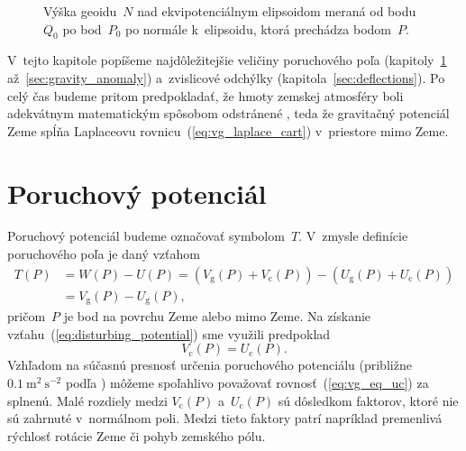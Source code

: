 \documentclass[a4paper, 12pt]{book}
\newcommand{\gidx}{\mathrm g}
\newcommand{\cidx}{\mathrm c}
\begin{document}
\begin{figure}[bt]
\centering

\caption{Výška geoidu~$N$ nad ekvipotenciálnym elipsoidom meraná od bodu~$Q_0$ 
po bod~$P_0$ po normále k~elipsoidu, ktorá prechádza bodom~$P$.}
\label{fig:geoid}
\end{figure}

V~tejto kapitole popíšeme najdôležitejšie veličiny poruchového poľa 
(kapitoly~\ref{sec:disturbing_potential} až~\ref{sec:gravity_anomaly}) 
a~zvislicové odchýlky (kapitola~\ref{sec:deflections}).  Po celý čas budeme 
pritom predpokladať, že hmoty zemskej atmosféry boli adekvátnym matematickým 
spôsobom odstránené \parencite[pozri napríklad][]{Janak2006}, teda že 
gravitačný potenciál Zeme spĺňa Laplaceovu rovnicu~(\ref{eq:vg_laplace_cart}) 
v~priestore mimo Zeme.






\section{Poruchový potenciál}
\label{sec:disturbing_potential}

Poruchový potenciál budeme označovať symbolom~$T$.  V~zmysle definície 
poruchového poľa je daný vzťahom
%
\begin{equation}
\label{eq:disturbing_potential}
\begin{split}
T(P) &= W(P) - U(P) = (V_\gidx(P) + V_\cidx(P)) - (U_\gidx(P) + U_\cidx(P))\\
%
&= V_\gidx(P) - U_\gidx(P){,}
\end{split}
\end{equation}
%
pričom~$P$ je bod na povrchu Zeme alebo mimo Zeme.  Na získanie 
vzťahu~(\ref{eq:disturbing_potential}) sme využili predpoklad
%
\begin{equation}
\label{eq:vg_eq_uc}
V_\cidx(P) = U_\cidx(P){.}
\end{equation}
%
Vzhľadom na súčasnú presnosť určenia poruchového potenciálu (približne $0.1\ 
\mathrm{m}^2 \ \mathrm{s}^{-2}$ podľa \cite{SansoGeoidDetermination}) môžeme 
spoľahlivo považovať rovnosť~(\ref{eq:vg_eq_uc}) za splnenú.  Malé rozdiely 
medzi $V_\cidx(P)$ a~$U_\cidx(P)$ sú dôsledkom faktorov, ktoré nie sú zahrnuté 
v~normálnom poli.  Medzi tieto faktory patrí napríklad premenlivá rýchlosť 
rotácie Zeme či pohyb zemského pólu.
\end{document}
